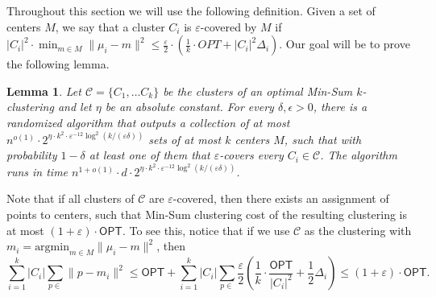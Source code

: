 \documentclass[10pt,a4paper]{amsart}
\newtheorem{lemma}[theorem]{Lemma}
\def \OPT    {\mdef{\mathsf{OPT}}}
\newcommand{\mdef}[1]{{\ensuremath{#1}}\xspace}  %
\begin{document}
Throughout this section we will use the following definition. Given a set of centers $M$, we say that a cluster $C_i$ is $\varepsilon$-covered by $M$ if $|C_i|^2\cdot \min_{m\in M}\|\mu_i-m\|^2\leq \frac{\varepsilon}{2}\cdot \left(\frac{1}{k}\cdot OPT + |C_i|^2 \Delta_i\right)$.
Our goal will be to prove the following lemma.
\begin{lemma}
\label{lem:approxmeans}
    Let $\mathcal{C}=\{C_1,\ldots C_k\}$ be the clusters of an optimal Min-Sum $k$-clustering and let $\eta$ be an absolute constant.
    For every $\delta, \epsilon > 0$, there is a randomized algorithm that 
    outputs a collection of at most $n^{o(1)} \cdot 2^{\eta\cdot k^2 \cdot \varepsilon^{-12} \log^2(k/(\varepsilon\delta))}$ sets of at most $k$ centers $M$, such that with probability $1 -\delta$ at least one of them that $\varepsilon$-covers every $C_i \in \mathcal{C}$. The algorithm runs in time $n^{1+o(1)} \cdot d \cdot 2^{\eta\cdot k^2 \cdot \varepsilon^{-12} \log^2(k/(\varepsilon\delta))}$.
\end{lemma}

Note that if all clusters of $\mathcal{C}$ are $\varepsilon$-covered, then there exists an assignment of points to centers, such that Min-Sum clustering cost of the resulting clustering is at most $(1+\varepsilon)\cdot \OPT$. To see this, notice that if we use $\mathcal{C}$ as the clustering with $m_i=\text{argmin}_{m\in M}\|\mu_i-m\|^2$, then 
$$\sum_{i=1}^k |C_i| \sum_{p\in} \|p-m_i\|^2 \leq \OPT + \sum_{i=1}^k |C_i| \sum_{p\in} \frac{\varepsilon}{2} \left(\frac{1}{k}\cdot \frac{\OPT}{|C_i|^2} + \frac{1}{2}\Delta_i\right) \leq (1+\varepsilon)\cdot \OPT.$$




\end{document}
